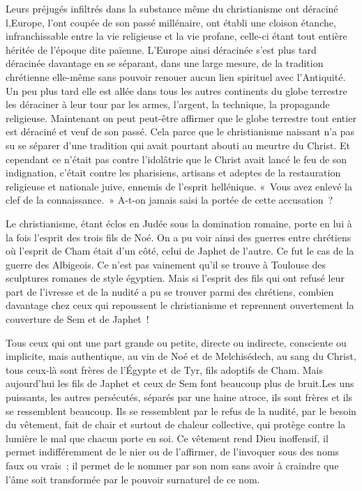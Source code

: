 \documentclass[french,twoside]{book} %
\begin{document}
Leurs préjugés infiltrés dans la substance même du christianisme ont déraciné l,Europe, l'ont coupée de son passé millénaire, ont établi une cloison étanche, infranchissable entre la vie religieuse et la vie profane, celle-ci étant tout entière héritée de l'époque dite païenne. L'Europe ainsi déracinée s'est plus tard déracinée davantage en se séparant, dans une large mesure, de la tradition chrétienne elle-même sans pouvoir renouer aucun lien spirituel avec l'Antiquité. Un peu plus tard elle est allée dans tous les autres continents du globe terrestre les déraciner à leur tour par les armes, l'argent, la technique, la propagande religieuse. Maintenant on peut peut-être affirmer que le globe terrestre tout entier est déraciné et veuf de son passé. Cela parce que le christianisme naissant n'a pas su se séparer d'une tradition qui avait pourtant abouti au meurtre du Christ. Et cependant ce n'était pas contre l'idolâtrie que le Christ avait lancé le feu de son indignation, c'était contre les pharisiens, artisans et adeptes de la restauration religieuse et nationale juive, ennemis de l'esprit hellénique. « Vous avez enlevé la clef de la connaissance. » A-t-on jamais saisi la portée de cette accusation ?\par
Le christianisme, étant éclos en Judée sous la domination romaine, porte en lui à la fois l'esprit des trois fils de Noé. On a pu voir ainsi des guerres entre chrétiens où l'esprit de Cham était d'un côté, celui de Japhet de l'autre. Ce fut le cas de la guerre des Albigeois. Ce n'est pas vainement qu'il se trouve à Toulouse des sculptures romanes de style égyptien. Mais si l'esprit des fils qui ont refusé leur part de l'ivresse et de la nudité a pu se trouver parmi des chrétiens, combien davantage chez ceux qui repoussent le christianisme et reprennent ouvertement la couverture de Sem et de Japhet !\par
Tous ceux qui ont une part grande ou petite, directe ou indirecte, consciente ou implicite, mais authentique, au vin de Noé et de Melchisédech, au sang du Christ, tous ceux-là sont frères de l'Égypte et de Tyr, fils adoptifs de Cham. Mais aujourd'hui les fils de Japhet et ceux de Sem font beaucoup plus de bruit.Les uns puissants, les autres persécutés, séparés par une haine atroce, ils sont frères et ils se ressemblent beaucoup. Ils se ressemblent par le refus de la nudité, par le besoin du vêtement, fait de chair et surtout de chaleur collective, qui protège contre la lumière le mal que chacun porte en soi. Ce vêtement rend Dieu inoffensif, il permet indifféremment de le nier ou de l'affirmer, de l'invoquer sous des noms faux ou vrais ; il permet de le nommer par son nom sans avoir à craindre que l'âme soit transformée par le pouvoir surnaturel de ce nom.\par
\end{document}
